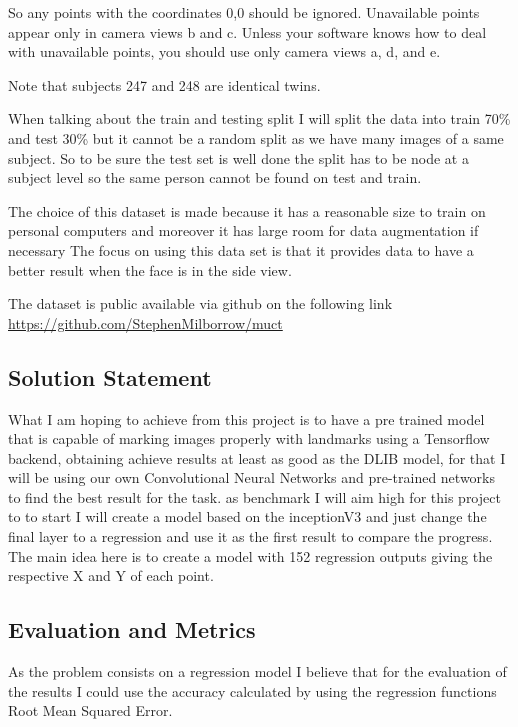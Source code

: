 \documentclass[11pt]{article}
\begin{document}
So any points with the coordinates 0,0 should be ignored.  Unavailable
points appear only in camera views b and c.  Unless your software
knows how to deal with unavailable points, you should use only camera
views a, d, and e.

Note that subjects 247 and 248 are identical twins.


When talking about the train and testing split I will split the data into
train 70\% and test 30\% but it cannot be a random split as we have many images
of a same subject.
So to be sure the test set is well done the split has to be node at a subject
level so the same person cannot be found on test and train.

The choice of this dataset is made because it has a reasonable size to train
on personal computers and moreover it has large room for data augmentation
if necessary
The focus on using this data set is that it provides data
to have a better result when the face is in the side view.


The dataset is public available via github on the following link
\url{https://github.com/StephenMilborrow/muct}

\subsection{Solution Statement}
\label{sec:org3e1888b}

What I am hoping to achieve from this project is to have a pre trained model that is capable
of marking images properly with landmarks using a Tensorflow  backend, obtaining 
achieve results at least as good as the DLIB model, for that I will be using
our own Convolutional Neural Networks and pre-trained networks to find the best
result for the task.
as benchmark I will aim high for this project to to start I will create a
model based on the inceptionV3  and just change the final layer to a
regression and use it as the first result to compare the progress.
The main idea here is to create a model with 152 regression outputs giving
the respective X and Y of each point.

\subsection{Evaluation and Metrics}
\label{sec:org7ebac43}

As the problem consists on a regression model I believe that for the
evaluation of the results I could use the accuracy calculated by using the
regression functions Root Mean Squared Error. 
\end{document}
